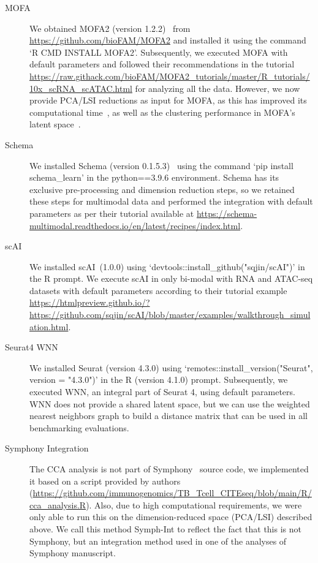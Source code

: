 \begin{description}
    \item[MOFA] 
    We obtained MOFA2 (version 1.2.2)~\citep{argelaguet2020mofa+} from \href{https://github.com/bioFAM/MOFA2}{https://github.com/bioFAM/MOFA2} and installed it using the command `R CMD INSTALL MOFA2'. Subsequently, we executed MOFA with default parameters and followed their recommendations in the tutorial \url{https://raw.githack.com/bioFAM/MOFA2_tutorials/master/R_tutorials/10x_scRNA_scATAC.html} for analyzing all the data. However, we now provide PCA/LSI reductions as input for MOFA, as this has improved its computational time~, as well as the clustering performance in MOFA's latent space~.
    
    \item[Schema]
    We installed Schema (version 0.1.5.3)~\citep{singh2021schema} using the command `pip install schema\_learn' in the python==3.9.6 environment. Schema has its exclusive pre-processing and dimension reduction steps, so we retained these steps for multimodal data and performed the integration with default parameters as per their tutorial available at \url{https://schema-multimodal.readthedocs.io/en/latest/recipes/index.html}.
    
    \item[scAI]
    We installed scAI~(1.0.0) using `devtools::install\_github("sqjin/scAI")' in the R prompt. We execute scAI in only bi-modal with RNA and ATAC-seq datasets with default parameters according to their tutorial example \url{https://htmlpreview.github.io/?https://github.com/sqjin/scAI/blob/master/examples/walkthrough_simulation.html}.

    \item[Seurat4 WNN]
    We installed Seurat (version 4.3.0) using `remotes::install\_version("Seurat", version = "4.3.0")' in the R (version 4.1.0) prompt. Subsequently, we executed WNN, an integral part of Seurat 4, using default parameters. WNN does not provide a shared latent space, but we can use the weighted nearest neighbors graph to build a distance matrix that can be used in all benchmarking evaluations.
    
    \item[Symphony Integration]
    The CCA analysis is not part of Symphony~\citep{kang2021symphony} source code, we implemented it based on a script provided by authors (\url{https://github.com/immunogenomics/TB_Tcell_CITEseq/blob/main/R/cca_analysis.R}). Also, due to high computational requirements, we were only able to run this on the dimension-reduced space (PCA/LSI) described above. We call this method Symph-Int to reflect the fact that this is not Symphony, but an integration method used in one of the analyses of Symphony manuscript. 
    

\end{description}

